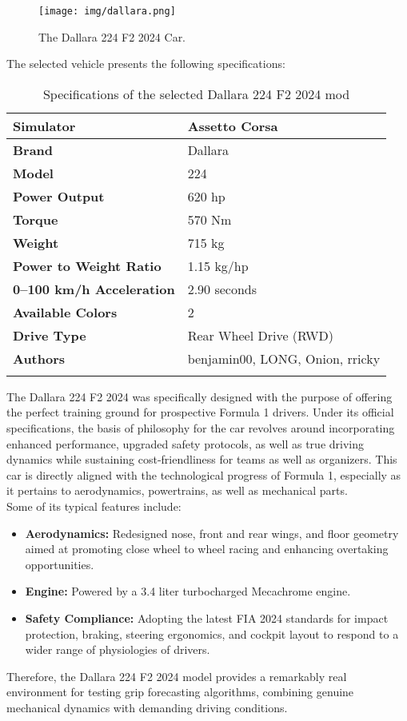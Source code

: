 \documentclass[a4paper,final,12pt]{report}
\begin{document}
\newpage
\begin{figure}[hbtp]
\centering
\texttt{[image: img/dallara.png]}
\caption{The Dallara 224 F2 2024 Car.}
\label{figura:dallara}
\end{figure}

The selected vehicle presents the following specifications:

\begin{longtable}{|l|l|}
\hline
\textbf{Simulator} & Assetto Corsa \\ \hline
\textbf{Brand} & Dallara \\ \hline
\textbf{Model} & 224 \\ \hline
\textbf{Power Output} & 620 hp \\ \hline
\textbf{Torque} & 570 Nm \\ \hline
\textbf{Weight} & 715 kg \\ \hline
\textbf{Power to Weight Ratio} & 1.15 kg/hp \\ \hline
\textbf{0--100 km/h Acceleration} & 2.90 seconds \\ \hline
\textbf{Available Colors} & 2 \\ \hline
\textbf{Drive Type} & Rear Wheel Drive (RWD) \\ \hline
\textbf{Authors} & benjamin00, LONG, Onion, rricky \\ \hline
\caption{Specifications of the selected Dallara 224 F2 2024 mod}
\label{tab:dallara_specs}
\end{longtable}

The Dallara 224 F2 2024 was specifically designed with the purpose of offering the perfect training ground for prospective Formula 1 drivers. Under its official specifications, the basis of philosophy for the car revolves around incorporating enhanced performance, upgraded safety protocols, as well as true driving dynamics while sustaining cost-friendliness for teams as well as organizers. This car is directly aligned with the technological progress of Formula 1, especially as it pertains to aerodynamics, powertrains, as well as mechanical parts.\\


Some of its typical features include:
\begin{itemize}
    \item \textbf{Aerodynamics:} Redesigned nose, front and rear wings, and floor geometry aimed at promoting close wheel to wheel racing and enhancing overtaking opportunities.
    \item \textbf{Engine:} Powered by a 3.4 liter turbocharged Mecachrome engine.
    \item \textbf{Safety Compliance:} Adopting the latest FIA 2024 standards for impact protection, braking, steering ergonomics, and cockpit layout to respond to a wider range of physiologies of drivers.
\end{itemize}
Therefore, the Dallara 224 F2 2024 model provides a remarkably real environment for testing grip forecasting algorithms, combining genuine mechanical dynamics with demanding driving conditions.
\end{document}
